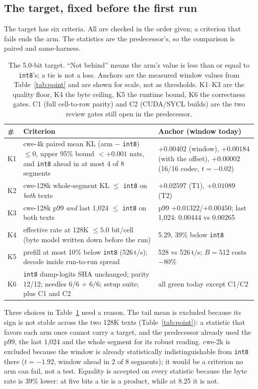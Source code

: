 \documentclass[10pt,twocolumn]{article}
\begin{document}
\subsection{The target, fixed before the first run}

The target has six criteria. All are checked in the order given; a criterion that fails ends the arm. The statistics are the predecessor's, so the comparison is paired and same-harness.

\begin{table}[t]
\centering
\footnotesize
\caption{The 5.0-bit target. ``Not behind'' means the arm's value is less than or equal to \texttt{int8}'s; a tie is not a loss. Anchors are the measured window values from Table~\ref{tab:point} and are shown for scale, not as thresholds. K1--K3 are the quality floor, K4 the byte ceiling, K5 the runtime bound, K6 the correctness gates. C1 (full cell-to-row parity) and C2 (CUDA/SYCL builds) are the two review gates still open in the predecessor.}
\label{tab:target}
\begin{tabularx}{\textwidth}{@{}l>{\raggedright\arraybackslash}Xl@{}}
\toprule
\# & Criterion & Anchor (window today) \\
\midrule
K1 & cwe-4k paired mean KL (arm $-$ \texttt{int8}) $\le 0$, upper 95\% bound $< +0.001$ nats, and \texttt{int8} ahead in at most 4 of 8 segments & $+0.00402$ (window), $+0.00184$ (with the offset), $+0.00002$ (16/16 codec, $t{=}-0.02$) \\
K2 & cwe-128k whole-segment KL $\le$ \texttt{int8} on \emph{both} texts & $+0.02597$ (T1), $+0.01089$ (T2) \\
K3 & cwe-128k p99 \emph{and} last 1,024 $\le$ \texttt{int8} on both texts & p99 $+0.01322$/$+0.00450$; last 1,024: 0.00444 vs 0.00265 \\
K4 & effective rate at 128K $\le 5.0$ bit/cell (byte model written down before the run) & 5.29, 39\% below \texttt{int8} \\
K5 & prefill at most 10\% below \texttt{int8} (526\,t/s); decode inside run-to-run spread & 528 vs 526\,t/s; $B{=}512$ costs $-80\%$ \\
K6 & \texttt{int8} dump-logits SHA unchanged; parity 12/12; needles 6/6 $+$ 6/6; setup suite; plus C1 and C2 & all green today except C1/C2 \\
\bottomrule
\end{tabularx}
\end{table}

Three choices in Table~\ref{tab:target} need a reason. The tail mean is excluded because its sign is not stable across the two 128K texts (Table~\ref{tab:point}): a statistic that favors each arm once cannot carry a target, and the predecessor already used the p99, the last 1,024 and the whole segment for its robust reading. cwe-2k is excluded because the window is already statistically indistinguishable from \texttt{int8} there ($t{=}-1.92$, window ahead in 2 of 8 segments); it would be a criterion no arm can fail, not a test. Equality is accepted on every statistic because the byte rate is 39\% lower: at five bits a tie is a product, while at 8.25 it is not.
\end{document}
